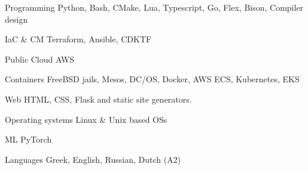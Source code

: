 


\begin{cvskills}


\cvskill
{Programming} %
{Python, Bash, CMake, Lua, Typescript, Go, Flex, Bison, Compiler design} %


\cvskill
		{IaC \& CM} %
{Terraform, Ansible, CDKTF} %


\cvskill
{Public Cloud} %
{AWS} %


\cvskill
{Containers} %
{FreeBSD jails, Mesos, DC/OS, Docker, AWS ECS, Kubernetes, EKS} %


\cvskill
{Web} %
{HTML, CSS, Flask and static site generators.} %


\cvskill
{Operating systems} %
{Linux \& Unix based OSs} %




\cvskill
{ML} %
{PyTorch} %


\cvskill
{Languages} %
{Greek, English, Russian, Dutch (A2)} %

\end{cvskills}
